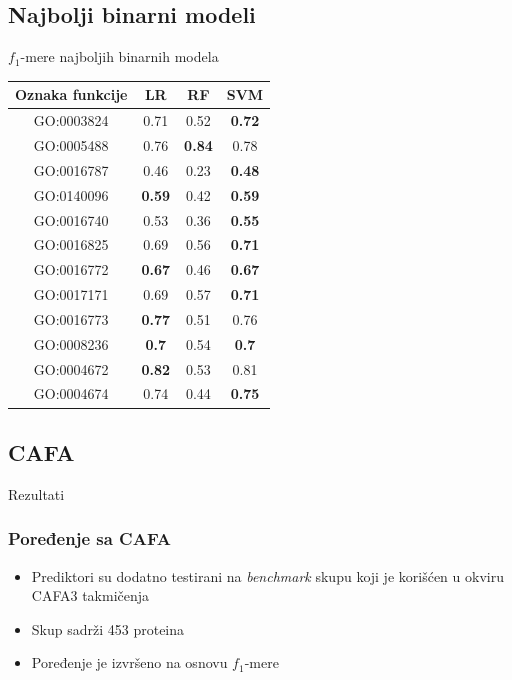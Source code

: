 \documentclass{beamer}
\begin{document}
\subsection{Najbolji binarni modeli}
\begin{frame}{$f_1$-mere najboljih binarnih modela}
	\begin{table}[H]
		\centering
		\begin{tabular}{|c|c|c|c|}
			\hline
			Oznaka funkcije & LR & RF & SVM \\
			\hline
			GO:0003824 & 0.71 & 0.52 & \textbf{0.72} \\
			\hline
			GO:0005488 & 0.76 & \textbf{0.84} & 0.78 \\
			\hline
			GO:0016787 & 0.46 & 0.23 & \textbf{0.48}\\
			\hline
			GO:0140096 & \textbf{0.59} & 0.42 & \textbf{0.59} \\
			\hline
			GO:0016740 & 0.53 & 0.36 & \textbf{0.55} \\
			\hline
			GO:0016825 & 0.69 & 0.56 & \textbf{0.71} \\
			\hline
			GO:0016772 & \textbf{0.67} & 0.46 & \textbf{0.67} \\
			\hline
			GO:0017171 & 0.69 & 0.57 & \textbf{0.71} \\
			\hline
			GO:0016773 & \textbf{0.77} & 0.51 & 0.76 \\
			\hline
			GO:0008236 & \textbf{0.7} & 0.54 & \textbf{0.7} \\
			\hline
			GO:0004672 & \textbf{0.82} & 0.53 & 0.81 \\
			\hline
			GO:0004674 & 0.74 & 0.44 & \textbf{0.75} \\
			\hline
		\end{tabular}
		\label{tab: commonScores}
	\end{table}
\end{frame}

\subsection{CAFA}
\begin{frame}{Rezultati}
	\frametitle{Poređenje sa CAFA}
	\begin{itemize}
		\item Prediktori su dodatno testirani na \textit{benchmark} skupu koji je korišćen u okviru CAFA3 takmičenja
		
		\item Skup sadrži 453 proteina 
		
		\item Poređenje je izvršeno na osnovu $f_1$-mere
		
	\end{itemize}
	
\end{frame}
\end{document}
